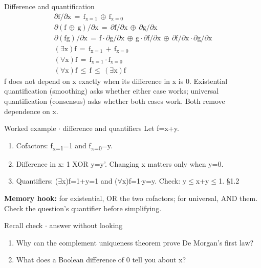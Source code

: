 \documentclass[11pt]{article}
\begin{document}
\begin{keepsection}
\begin{keepsection}
\begin{equationcard}{Difference and quantification}
\[ \begin{gathered} ∂\mathrm{f}/∂\mathrm{x}\, =\, \mathrm{f}_{\mathrm{x}=1}\, ⊕\, \mathrm{f}_{\mathrm{x}=0} \\ ∂(\mathrm{f}\, ⊕\, \mathrm{g})/∂\mathrm{x}\, =\, ∂\mathrm{f}/∂\mathrm{x}\, ⊕\, ∂\mathrm{g}/∂\mathrm{x} \\ ∂(\text{fg})/∂\mathrm{x}\, =\, \mathrm{f}\cdot ∂\mathrm{g}/∂\mathrm{x}\, ⊕\, \mathrm{g}\cdot ∂\mathrm{f}/∂\mathrm{x}\, ⊕\, ∂\mathrm{f}/∂\mathrm{x}\cdot ∂\mathrm{g}/∂\mathrm{x} \\ (\exists \mathrm{x})\mathrm{f}\, =\, \mathrm{f}_{\mathrm{x}=1}\, +\, \mathrm{f}_{\mathrm{x}=0} \\ (\forall \mathrm{x})\mathrm{f}\, =\, \mathrm{f}_{\mathrm{x}=1}\cdot \mathrm{f}_{\mathrm{x}=0} \\ (\forall \mathrm{x})\mathrm{f}\, \leq \, \mathrm{f}\, \leq \, (\exists \mathrm{x})\mathrm{f} \end{gathered} \]
{\small f does not depend on x exactly when its difference in x is 0. Existential quantification (smoothing) asks whether either case works; universal quantification (consensus) asks whether both cases work. Both remove dependence on x.}
\end{equationcard}

\begin{workedbox}{Worked example \ensuremath{\cdot} difference and quantifiers}
Let f=x+y.

\begin{enumerate}
\item Cofactors: f\textsubscript{x=1}=1 and f\textsubscript{x=0}=y.
\item Difference in x: 1 XOR y=y'. Changing x matters only when y=0.
\item Quantifiers: (\ensuremath{\exists}x)f=1+y=1 and (\ensuremath{\forall}x)f=1\ensuremath{\cdot}y=y. Check: y\ensuremath{\leq}x+y\ensuremath{\leq}1. \hfill{\small\color{FAUblue}§1.2}
\end{enumerate}
\end{workedbox}

\begin{notebox}\textbf{Memory hook:} for existential, OR the two cofactors; for universal, AND them. Check the question’s quantifier before simplifying.\end{notebox}

\begin{recallbox}{Recall check \ensuremath{\cdot} answer without looking}
\begin{enumerate}
\item Why can the complement uniqueness theorem prove De Morgan’s first law?
\item What does a Boolean difference of 0 tell you about x?
\end{enumerate}


\end{recallbox}
\end{keepsection}
\end{keepsection}
\end{document}
